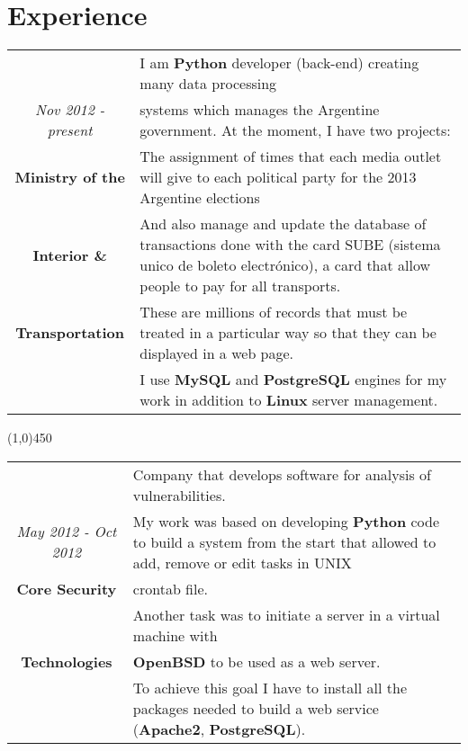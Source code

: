 \section{Experience}

\begin{tabular}{c|p{12.5cm}}
& \large I am \textbf{Python} developer (back-end) creating many data processing\\
\large\textit{Nov 2012 - present} &  \large systems which manages the Argentine government. At the moment, I have two projects:\\
\large\textbf{Ministry of the} & \large The assignment of times that each media outlet will give to each political party for the 2013 Argentine elections\\
\large\textbf{Interior \&}& \large And also manage and update the database of transactions done with
the card SUBE (sistema unico de boleto electrónico), a card that allow people to pay for all
transports. \\
 \large\textbf{Transportation} & \large These are millions of records that must be treated in a particular way so that they can
be displayed in a web page.\\
& \large I use \textbf{MySQL} and \textbf{PostgreSQL} engines for my work in addition to \textbf{Linux} server management.\\
\end{tabular}

\begin{center}
\line(1,0){450}
\end{center}
\begin{tabular}{c|p{12.5cm}}
& \large Company that develops software for analysis of vulnerabilities.\\
\large\textit{May 2012 - Oct 2012} &  \large My work was based on developing \textbf{Python} code to build a system from the start that allowed to add, remove or edit tasks in UNIX\\
\large\textbf{Core Security} & \large  crontab file.\\
 & \large  Another task was to initiate a server in a virtual machine with \\
\large\textbf{Technologies} & \large\textbf{OpenBSD} to be used as a web server. \\
& \large To achieve this goal I have to install all the packages needed to build a web service (\textbf{Apache2}, \textbf{PostgreSQL}). \\
\end{tabular}

